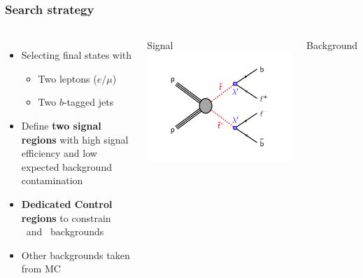 \documentclass[10pt, svgnames]{beamer}
\begin{document}
\begin{frame}
  \frametitle{Search strategy}
  \begin{columns}
    \begin{itemize}
      \item Selecting final states with
        \begin{itemize}
          \item {\color{nice_blue}Two leptons} ($e/\mu$)
          \item {\color{nice_red}Two $b$-tagged jets}
        \end{itemize}
      \item Define {\color{nice_blue}\textbf{two signal regions}} with high signal
        efficiency and low expected background contamination
      \item \textbf{\color{nice_red} Dedicated Control regions} to constrain
        \TTBAR\ and \ZGAMMA\ backgrounds
      \item Other backgrounds taken from MC
    \end{itemize}
    \begin{block}{Signal}
      \includegraphics[width=\textwidth]{figures/b_minus_l_stop_stop.pdf}
    \end{block}
    \begin{block}{Background}

\end{block}
\end{columns}
\end{frame}
\end{document}
